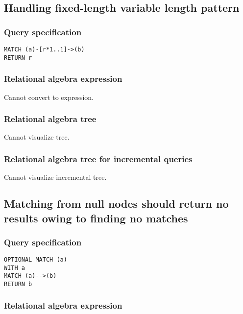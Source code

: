 \subsection{Handling fixed-length variable length pattern}

\subsubsection*{Query specification}

\begin{lstlisting}
MATCH (a)-[r*1..1]->(b)
RETURN r
\end{lstlisting}

\subsubsection*{Relational algebra expression}

Cannot convert to expression.

\subsubsection*{Relational algebra tree}

Cannot visualize tree.

\subsubsection*{Relational algebra tree for incremental queries}

Cannot visualize incremental tree.

\subsection{Matching from null nodes should return no results owing to finding no matches}

\subsubsection*{Query specification}

\begin{lstlisting}
OPTIONAL MATCH (a)
WITH a
MATCH (a)-->(b)
RETURN b
\end{lstlisting}

\subsubsection*{Relational algebra expression}

